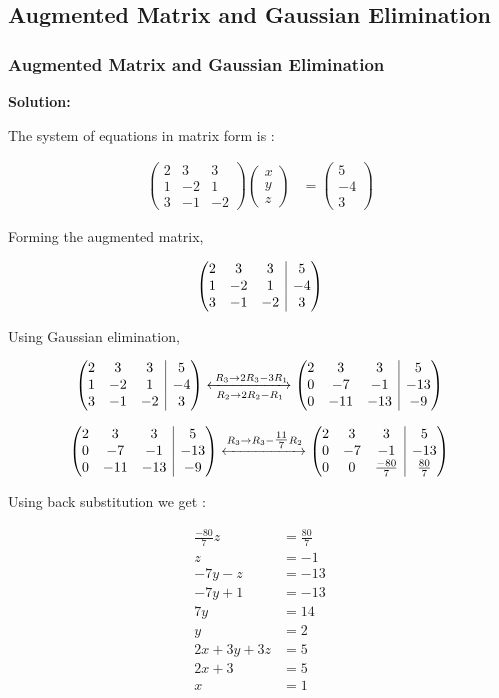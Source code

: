 \documentclass{beamer}
\makeatletter
\numberwithin{equation}{section}
\theoremstyle{remark}
\newcommand{\myvec}[1]{\ensuremath{\begin{pmatrix}#1\end{pmatrix}}}
\newenvironment{amatrix}[1]{%
  \left(\begin{array}{@{}*{#1}{c}|c@{}}
}{%
  \end{array}\right)
}
\newcommand{\myaugvec}[2]{\ensuremath{\begin{amatrix}{#1}#2\end{amatrix}}}
\makeatother
\begin{document}
\subsection{Augmented Matrix and Gaussian Elimination}
\begin{frame}
\frametitle{Augmented Matrix and Gaussian Elimination}
\textbf{Solution:}


The system of equations in matrix form is :

\begin{align}
  \myvec{2 & 3 & 3\\1 & -2 & 1\\3 & -1 & -2}\myvec{x\\y\\z} &= \myvec{5\\-4\\3}
\end{align}

Forming the augmented matrix,

\begin{align}
  \myaugvec{3}{2 & 3 & 3 & 5\\ 1 & -2 & 1 & -4\\3 & -1 & -2 & 3}
\end{align}

Using Gaussian elimination,

\begin{align}
  \myaugvec{3}{2 & 3 & 3 & 5\\ 1 & -2 & 1 & -4\\3 & -1 & -2 & 3}
  \xleftrightarrow[\;R_2 \to 2R_2 -R_1\;]{\;R_3 \to 2R_3 - 3R_1}
  \myaugvec{3}{2 & 3 & 3 & 5\\0 & -7 & -1 & -13\\0 & -11 & -13 & -9}
  \end{align}
  \end{frame}
  \begin{frame}
  \begin{align}
   \myaugvec{3}{2 & 3 & 3 & 5\\0 & -7 & -1 & -13\\0 & -11 & -13 & -9}
  \xleftrightarrow{R_3 \to R_3 -\tfrac{11}{7}R_2}
  \myaugvec{3}{2 & 3 & 3 & 5\\0 & -7 & -1 & -13\\0 & 0 & \tfrac{-80}{7} & \tfrac{80}{7}}
\end{align}

Using back substitution we get :

\begin{align}
  \tfrac{-80}{7} z &= \tfrac{80}{7}\\ 
  z &= -1\\
  -7y - z &= -13\\
  -7y +1 &= -13\\
  7y &= 14\\
  y &= 2\\
  2x + 3y + 3z &= 5\\
  2x + 3 &= 5\\
  x &= 1
\end{align}

\end{frame}
\end{document}

